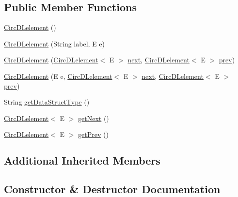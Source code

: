 \subsection*{Public Member Functions}
\begin{DoxyCompactItemize}
\item 
\hyperlink{classbridges_1_1base_1_1_circ_d_lelement_ad14ccb772d52c36802c118f2b3f15d59}{Circ\+D\+Lelement} ()
\item 
\hyperlink{classbridges_1_1base_1_1_circ_d_lelement_a84b2ebf47d2ca24077a800b240d8d157}{Circ\+D\+Lelement} (String label, E e)
\item 
\hyperlink{classbridges_1_1base_1_1_circ_d_lelement_a98a471fc3225ed80595e1ffdb377e336}{Circ\+D\+Lelement} (\hyperlink{classbridges_1_1base_1_1_circ_d_lelement}{Circ\+D\+Lelement}$<$ E $>$ \hyperlink{classbridges_1_1base_1_1_s_lelement_abf61c96a74ad319d561c6952ea388e0e}{next}, \hyperlink{classbridges_1_1base_1_1_circ_d_lelement}{Circ\+D\+Lelement}$<$ E $>$ \hyperlink{classbridges_1_1base_1_1_d_lelement_a6eba4876f820b75ac6bde01d7dea9da7}{prev})
\item 
\hyperlink{classbridges_1_1base_1_1_circ_d_lelement_a86e04c826251be9a1a92c4649844e5e7}{Circ\+D\+Lelement} (E e, \hyperlink{classbridges_1_1base_1_1_circ_d_lelement}{Circ\+D\+Lelement}$<$ E $>$ \hyperlink{classbridges_1_1base_1_1_s_lelement_abf61c96a74ad319d561c6952ea388e0e}{next}, \hyperlink{classbridges_1_1base_1_1_circ_d_lelement}{Circ\+D\+Lelement}$<$ E $>$ \hyperlink{classbridges_1_1base_1_1_d_lelement_a6eba4876f820b75ac6bde01d7dea9da7}{prev})
\item 
String \hyperlink{classbridges_1_1base_1_1_circ_d_lelement_ab4885ae7517f1dd04874270c1c3eaf44}{get\+Data\+Struct\+Type} ()
\item 
\hyperlink{classbridges_1_1base_1_1_circ_d_lelement}{Circ\+D\+Lelement}$<$ E $>$ \hyperlink{classbridges_1_1base_1_1_circ_d_lelement_a9ace56dde1f4c23e9a8798c045100ee6}{get\+Next} ()
\item 
\hyperlink{classbridges_1_1base_1_1_circ_d_lelement}{Circ\+D\+Lelement}$<$ E $>$ \hyperlink{classbridges_1_1base_1_1_circ_d_lelement_aa2b83017a571694460f77dd31b4188ed}{get\+Prev} ()
\end{DoxyCompactItemize}
\subsection*{Additional Inherited Members}


\subsection{Constructor \& Destructor Documentation}
\mbox{\label{classbridges_1_1base_1_1_circ_d_lelement_ad14ccb772d52c36802c118f2b3f15d59}} 
